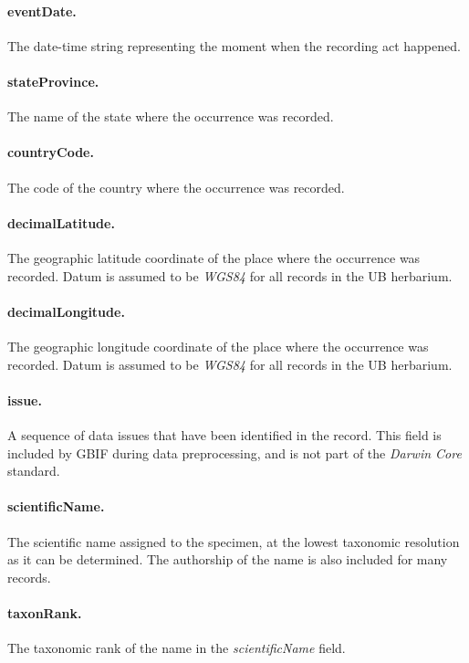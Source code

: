 \paragraph*{eventDate.} The date-time string representing the moment when the recording act happened.

\paragraph*{stateProvince.} The name of the state where the occurrence was recorded.

\paragraph*{countryCode.} The code of the country where the occurrence was recorded.

\paragraph*{decimalLatitude.} The geographic latitude coordinate of the place where the occurrence was recorded. 
Datum is assumed to be \textit{WGS84} for all records in the UB herbarium.

\paragraph*{decimalLongitude.} The geographic longitude coordinate of the place where the occurrence was recorded.
Datum is assumed to be \textit{WGS84} for all records in the UB herbarium.

\paragraph*{issue.} A sequence of data issues that have been identified in the record.
This field is included by GBIF during data preprocessing, and is not part of the \textit{Darwin Core} standard.%

\paragraph*{scientificName.} The scientific name assigned to the specimen, at the lowest taxonomic resolution as it can be determined. The authorship of the name is also included for many records.

\paragraph*{taxonRank.} The taxonomic rank of the name in the \textit{scientificName} field.

